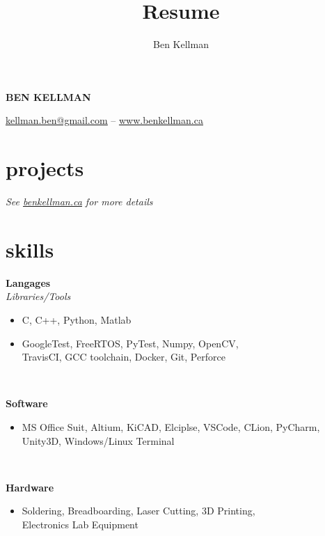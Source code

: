\documentclass{article}
\author{Ben Kellman}
\title{Resume}
\newcommand{\grayhline}{
  \noindent\makebox[\linewidth]{\textcolor{gray}{\rule{0.95\textwidth}{1pt}}}\\
}
\newcommand{\minicolumns}[2]{
  \begin{minipage}[t]{0.25\textwidth}
    \begin{flushright}
      #1
    \end{flushright}
  \end{minipage}
  \hfill
  \begin{minipage}[t]{0.7\textwidth}
    #2
  \end{minipage}
}
\newcommand{\resumeSection}[3]{
  \minicolumns{
      \textbf{#1}\\
      \textit{#2}
    }
    {
      \begin{itemize}[leftmargin=*]
          \justifying
          \setlength\itemsep{-0.1em}
          #3
      \end{itemize}
  }
  \vspace{0.5\baselineskip}
}
\begin{document}
\begin{center}
  \textbf{\LARGE{\MakeUppercase{Ben Kellman}}}

  \vspace{0.75em}
  \underline{\href{mailto: kellman.ben@gmail.com}{kellman.ben@gmail.com}} -- \underline{\href{www.BenKellman.ca}{www.benkellman.ca}}

\end{center}
\vspace{1em}

\begin{minipage}[t]{0.65\textwidth}
  \section{projects}
  
  \textit{See \underline{\href{www.benkellman.ca}{benkellman.ca}} for more details}

  \section{skills}
  \resumeSection{Langages}{Libraries/Tools}{
    \item C, C++, Python, Matlab
    \item GoogleTest, FreeRTOS, PyTest, Numpy, OpenCV,\\ TravisCI, GCC toolchain, Docker, Git, Perforce
  }

  \grayhline
  \resumeSection{Software}{}{
    \item MS Office Suit, Altium, KiCAD, Elciplse, VSCode, CLion, PyCharm, Unity3D, Windows/Linux Terminal
  }

  \grayhline
  \resumeSection{Hardware}{}{
    \item Soldering, Breadboarding, Laser Cutting, 3D Printing,\\ Electronics Lab Equipment
  }

\end{minipage}
\end{document}
